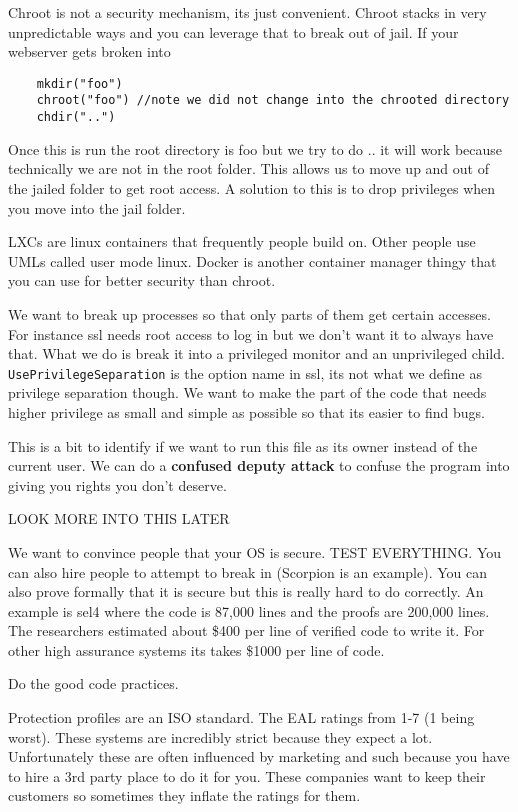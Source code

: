 \documentclass{article}
\begin{document}
Chroot is not a security mechanism, its just convenient. Chroot stacks in very unpredictable ways and you can leverage that to break out of jail. If your webserver gets broken into 

\begin{lstlisting}
	mkdir("foo")
	chroot("foo") //note we did not change into the chrooted directory 
	chdir("..")
\end{lstlisting}

Once this is run the root directory is foo but we try to do .. it will work because technically we are not in the root folder. This allows us to move up and out of the jailed folder to get root access. A solution to this is to drop privileges when you move into the jail folder. 

LXCs are linux containers that frequently people build on. Other people use UMLs called user mode linux. Docker is another container manager thingy that you can use for better security than chroot.


We want to break up processes so that only parts of them get certain accesses. For instance ssl needs root access to log in but we don't want it to always have that. What we do is break it into a privileged monitor and an unprivileged child. \texttt{UsePrivilegeSeparation} is the option name in ssl, its not what we define as privilege separation though. We want to make the part of the code that needs higher privilege as small and simple as possible so that its easier to find bugs.


This is a bit to identify if we want to run this file as its owner instead of the current user. We can do a \textbf{confused deputy attack} to confuse the program into giving you rights you don't deserve. 

LOOK MORE INTO THIS LATER


We want to convince people that your OS is secure. TEST EVERYTHING. You can also hire people to attempt to break in (Scorpion is an example). You can also prove formally that it is secure but this is really hard to do correctly. An example is sel4 where the code is 87,000 lines and the proofs are 200,000 lines. The researchers estimated about \$400 per line of verified code to write it. For other high assurance systems its takes \$1000 per line of code.


Do the good code practices.



Protection profiles are an ISO standard. The EAL ratings from 1-7 (1 being worst). These systems are incredibly strict because they expect a lot. Unfortunately these are often influenced by marketing and such because you have to hire a 3rd party place to do it for you. These companies want to keep their customers so sometimes they inflate the ratings for them. 
\end{document}
